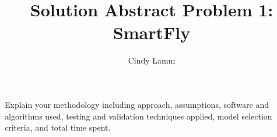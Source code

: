 \documentclass[12pt,a4paper]{article}
\author{Cindy Lamm}
\title{Solution Abstract Problem 1: SmartFly}
\begin{document}
\maketitle

Explain your methodology including approach, assumptions, software and algorithms used, testing and validation techniques applied, model selection criteria, and total time spent.
\end{document}
